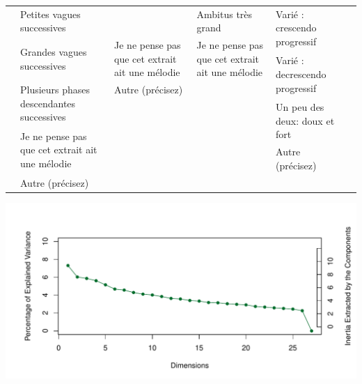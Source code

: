 \documentclass[
]{article}
\newenvironment{lltable}{\begin{landscape}\begin{center}\begin{ThreePartTable}}{\end{ThreePartTable}\end{center}\end{landscape}}
\begin{document}
\begin{lltable}
\begin{footnotesize}
\begin{longtable}{p{}p{}p{}p{}p{}p{}}
  & Petites vagues successives &  & Ambitus très grand & \multirow{2}{0.2\textwidth}{Varié : crescendo progressif} &\\
  & \multirow{2}{0.2\textwidth}{Grandes vagues successives} & \multirow{2}{0.2\textwidth}{Je ne pense pas que cet extrait ait une mélodie} & \multirow{2}{0.2\textwidth}{Je ne pense pas que cet extrait ait une mélodie} & &\\
  &   & & & \multirow{2}{0.2\textwidth}{Varié : decrescendo progressif}  & \\
  & \multirow{2}{0.2\textwidth}{Plusieurs phases descendantes successives} & Autre (précisez) & &  &\\
  & & & & \multirow{2}{0.2\textwidth}{Un peu des deux: doux et fort} & \\
  & \multirow{2}{0.2\textwidth}{Je ne pense pas que cet extrait ait une mélodie} & & &  & \\
  &  & & & Autre (précisez) & \\
  & Autre (précisez) & & &  & \\
  
\cmidrule[.75pt]{2-5}
\end{longtable}
\end{footnotesize}
\end{lltable}

\begin{center}\includegraphics{MusDes_Supplementary_files/figure-latex/screeRV-1} \end{center}
\end{document}
